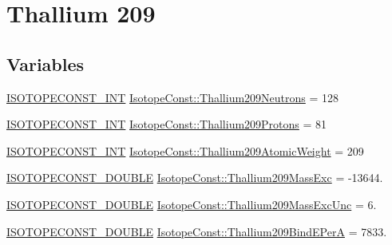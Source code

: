 \hypertarget{group___isotope_const-_thallium-_tl209}{}\section{Thallium 209}
\label{group___isotope_const-_thallium-_tl209}
\subsection*{Variables}
\begin{DoxyCompactItemize}
\item 
\mbox{\hyperlink{group___isotope_const-_macros_ga5f18360b3e99483a35c32d789e62621c}{I\+S\+O\+T\+O\+P\+E\+C\+O\+N\+S\+T\+\_\+\+I\+NT}} \mbox{\hyperlink{group___isotope_const-_thallium-_tl209_ga88620948db3f263e3ddc749bd5e8a47f}{Isotope\+Const\+::\+Thallium209\+Neutrons}} = 128
\item 
\mbox{\hyperlink{group___isotope_const-_macros_ga5f18360b3e99483a35c32d789e62621c}{I\+S\+O\+T\+O\+P\+E\+C\+O\+N\+S\+T\+\_\+\+I\+NT}} \mbox{\hyperlink{group___isotope_const-_thallium-_tl209_ga99d84b97142d59f55fb1757ec65f1499}{Isotope\+Const\+::\+Thallium209\+Protons}} = 81
\item 
\mbox{\hyperlink{group___isotope_const-_macros_ga5f18360b3e99483a35c32d789e62621c}{I\+S\+O\+T\+O\+P\+E\+C\+O\+N\+S\+T\+\_\+\+I\+NT}} \mbox{\hyperlink{group___isotope_const-_thallium-_tl209_ga2ca3e2954bcfcb9f45484af01b056d82}{Isotope\+Const\+::\+Thallium209\+Atomic\+Weight}} = 209
\item 
\mbox{\hyperlink{group___isotope_const-_macros_ga8f45a7272ce02c0b4c65c44636ed719a}{I\+S\+O\+T\+O\+P\+E\+C\+O\+N\+S\+T\+\_\+\+D\+O\+U\+B\+LE}} \mbox{\hyperlink{group___isotope_const-_thallium-_tl209_gac62d1bdfe1f9acd9d8af6a6a9293f087}{Isotope\+Const\+::\+Thallium209\+Mass\+Exc}} = -\/13644.
\item 
\mbox{\hyperlink{group___isotope_const-_macros_ga8f45a7272ce02c0b4c65c44636ed719a}{I\+S\+O\+T\+O\+P\+E\+C\+O\+N\+S\+T\+\_\+\+D\+O\+U\+B\+LE}} \mbox{\hyperlink{group___isotope_const-_thallium-_tl209_ga10a7d624f23c079a6b3b29a4f34aa625}{Isotope\+Const\+::\+Thallium209\+Mass\+Exc\+Unc}} = 6.
\item 
\mbox{\hyperlink{group___isotope_const-_macros_ga8f45a7272ce02c0b4c65c44636ed719a}{I\+S\+O\+T\+O\+P\+E\+C\+O\+N\+S\+T\+\_\+\+D\+O\+U\+B\+LE}} \mbox{\hyperlink{group___isotope_const-_thallium-_tl209_gaa8fc78769d65dd4ff380f3607ab6b036}{Isotope\+Const\+::\+Thallium209\+Bind\+E\+PerA}} = 7833.
\item 

\end{DoxyCompactItemize}
